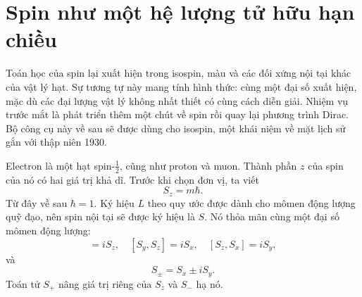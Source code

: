 \begin{classroomqa}
\end{classroomqa}

\section{Spin như một hệ lượng tử hữu hạn chiều}

Toán học của spin lại xuất hiện trong isospin, màu và các đối xứng nội tại khác của vật lý hạt. Sự tương tự này mang tính hình thức: cùng một đại số xuất hiện, mặc dù các đại lượng vật lý không nhất thiết có cùng cách diễn giải. Nhiệm vụ trước mắt là phát triển thêm một chút về spin rồi quay lại phương trình Dirac. Bộ công cụ này về sau sẽ được dùng cho isospin, một khái niệm về mặt lịch sử gắn với thập niên 1930.

Electron là một hạt spin-\(\tfrac12\), cũng như proton và muon. Thành phần \(z\) của spin của nó có hai giá trị khả dĩ. Trước khi chọn đơn vị, ta viết
\begin{equation}
S_z=m\hbar.
\end{equation}
Từ đây về sau \(\hbar=1\). Ký hiệu \(L\) theo quy ước được dành cho mômen động lượng quỹ đạo, nên spin nội tại sẽ được ký hiệu là \(S\). Nó thỏa mãn cùng một đại số mômen động lượng:
\begin{equation}
[S_x,S_y]=iS_z,
\quad
[S_y,S_z]=iS_x,
\quad
[S_z,S_x]=iS_y,
\end{equation}
và
\begin{equation}
S_\pm=S_x\pm iS_y.
\end{equation}
Toán tử \(S_+\) nâng giá trị riêng của \(S_z\) và \(S_-\) hạ nó.

\begin{classroomqa}
\end{classroomqa}


